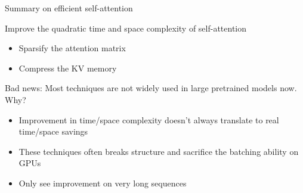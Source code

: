 \documentclass[usenames,dvipsnames,notes,11pt,aspectratio=169,hyperref={colorlinks=true, linkcolor=blue}]{beamer}
\begin{document}

\begin{frame}
    {Summary on efficient self-attention}

    Improve the quadratic time and space complexity of self-attention\\
    \begin{itemize}
        \item Sparsify the attention matrix
        \item Compress the KV memory
    \end{itemize}

    \pause
    Bad news: Most techniques are not widely used in large pretrained models now. Why?\\
    \begin{itemize}
        \item Improvement in time/space complexity doesn't always translate to real time/space savings
        \item These techniques often breaks structure and sacrifice the batching ability on GPUs
        \item Only see improvement on very long sequences
    \end{itemize}
\end{frame}
\end{document}
